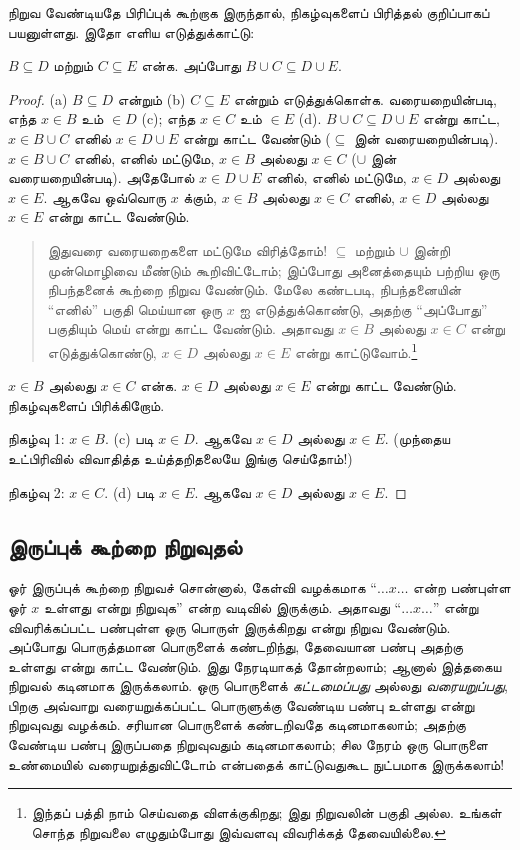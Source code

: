 \documentclass[../../../include/open-logic-section]{subfiles}
\begin{document}
நிறுவ வேண்டியதே பிரிப்புக் கூற்றாக இருந்தால், நிகழ்வுகளைப்
பிரித்தல் குறிப்பாகப் பயனுள்ளது. இதோ எளிய எடுத்துக்காட்டு:

\begin{prop}
$B \subseteq D$ மற்றும் $C \subseteq E$ என்க. அப்போது
$B \cup C \subseteq D \cup E$.
\end{prop}

\begin{proof}
  (a) $B \subseteq D$ என்றும் (b) $C \subseteq E$
  என்றும் எடுத்துக்கொள்க. வரையறையின்படி, எந்த $x \in B$
  உம் $\in D$ (c); எந்த $x \in C$ உம் $\in E$ (d).
  $B \cup C \subseteq D \cup E$ என்று காட்ட,
  $x \in B \cup C$ எனில் $x \in D \cup E$ என்று
  காட்ட வேண்டும் ($\subseteq$ இன் வரையறையின்படி).
  $x \in B \cup C$ எனில், எனில் மட்டுமே,
  $x \in B$ அல்லது $x \in C$ ($\cup$ இன்
  வரையறையின்படி). அதேபோல் $x \in D \cup E$
  எனில், எனில் மட்டுமே, $x \in D$ அல்லது $x \in E$.
  ஆகவே ஒவ்வொரு $x$ க்கும், $x \in B$ அல்லது
  $x \in C$ எனில், $x \in D$ அல்லது $x \in E$
  என்று காட்ட வேண்டும்.

  \begin{quote}
  இதுவரை வரையறைகளை மட்டுமே விரித்தோம்!{} $\subseteq$
  மற்றும் $\cup$ இன்றி முன்மொழிவை மீண்டும் கூறிவிட்டோம்;
  இப்போது அனைத்தையும் பற்றிய ஒரு நிபந்தனைக் கூற்றை
  நிறுவ வேண்டும். மேலே கண்டபடி, நிபந்தனையின் ``எனில்''
  பகுதி மெய்யான ஒரு $x$ ஐ எடுத்துக்கொண்டு, அதற்கு
  ``அப்போது'' பகுதியும் மெய் என்று காட்ட வேண்டும்.
  அதாவது $x \in B$ அல்லது $x \in C$ என்று
  எடுத்துக்கொண்டு, $x \in D$ அல்லது $x \in E$
  என்று காட்டுவோம்.\footnote{இந்தப் பத்தி நாம் செய்வதை
    விளக்குகிறது; இது நிறுவலின் பகுதி அல்ல. உங்கள் சொந்த
    நிறுவலை எழுதும்போது இவ்வளவு விவரிக்கத் தேவையில்லை.}
  \end{quote}

  $x \in B$ அல்லது $x \in C$ என்க. $x \in D$
  அல்லது $x \in E$ என்று காட்ட வேண்டும்.
  நிகழ்வுகளைப் பிரிக்கிறோம்.

  நிகழ்வு 1: $x \in B$. (c) படி $x \in D$. ஆகவே
  $x \in D$ அல்லது $x \in E$. (முந்தைய உட்பிரிவில்
  விவாதித்த உய்த்தறிதலையே இங்கு செய்தோம்!)

  நிகழ்வு 2: $x \in C$. (d) படி $x \in E$. ஆகவே
  $x \in D$ அல்லது $x \in E$.
\end{proof}

\subsection{இருப்புக் கூற்றை நிறுவுதல்}

ஓர் இருப்புக் கூற்றை நிறுவச் சொன்னால், கேள்வி வழக்கமாக
``$\dots x \dots$ என்ற பண்புள்ள ஓர் $x$ உள்ளது என்று
நிறுவுக'' என்ற வடிவில் இருக்கும். அதாவது
``$\dots x \dots$'' என்று விவரிக்கப்பட்ட பண்புள்ள
ஒரு பொருள் இருக்கிறது என்று நிறுவ வேண்டும். அப்போது பொருத்தமான
பொருளைக் கண்டறிந்து, தேவையான பண்பு அதற்கு உள்ளது
என்று காட்ட வேண்டும். இது நேரடியாகத் தோன்றலாம்; ஆனால்
இத்தகைய நிறுவல் கடினமாக இருக்கலாம். ஒரு பொருளைக்
\emph{கட்டமைப்பது} அல்லது \emph{வரையறுப்பது}, பிறகு
அவ்வாறு வரையறுக்கப்பட்ட பொருளுக்கு வேண்டிய பண்பு
உள்ளது என்று நிறுவுவது வழக்கம். சரியான பொருளைக்
கண்டறிவதே கடினமாகலாம்; அதற்கு வேண்டிய பண்பு இருப்பதை
நிறுவுவதும் கடினமாகலாம்; சில நேரம் ஒரு பொருளை உண்மையில்
வரையறுத்துவிட்டோம் என்பதைக் காட்டுவதுகூட நுட்பமாக இருக்கலாம்!{}
\end{document}
